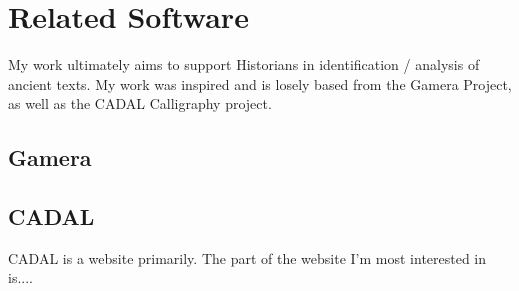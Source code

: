 \chapter{Related Software}

My work ultimately aims to support Historians in identification / analysis of ancient texts.  My work was inspired and is losely based from the Gamera Project, as well as the CADAL Calligraphy project.  

\section{Gamera}




\section{CADAL}

CADAL is a website primarily.  The part of the website I'm most interested in is....
